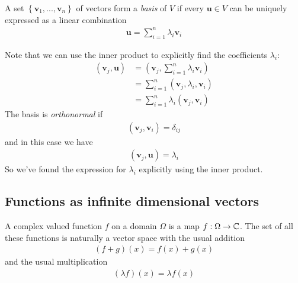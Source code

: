 \documentclass[a4paper]{article}
\begin{document}
A set $\left\{\mathbf{v}_1,...,\mathbf{v}_n\right\}$ of vectors form a \emph{basis} of $V$ if every $\mathbf{u}\in V$ can be uniquely expressed as a linear combination
\begin{equation*}
\begin{aligned}
\mathbf{u} = \sum_{i=1}^n \lambda_i \mathbf{v}_i
\end{aligned}
\end{equation*}

Note that we can use the inner product to explicitly find the coefficients $\lambda_i$:
\begin{equation*}
\begin{aligned}
\left(\mathbf{v}_j,\mathbf{u}\right) &= \left(\mathbf{v}_j,\sum_{i=1}^n \lambda_i \mathbf{v}_i\right)\\
&= \sum_{i=1}^n \left(\mathbf{v}_j,\lambda_i,\mathbf{v}_i\right)\\
&= \sum_{i=1}^n \lambda_i \left(\mathbf{v}_j,\mathbf{v}_i\right)
\end{aligned}
\end{equation*}
The basis is \emph{orthonormal} if
\begin{equation*}
\begin{aligned}
\left(\mathbf{v}_j,\mathbf{v}_i\right) = \delta_{ij}
\end{aligned}
\end{equation*}
and in this case we have
\begin{equation*}
\begin{aligned}
\left(\mathbf{v}_j,\mathbf{u}\right) = \lambda_i
\end{aligned}
\end{equation*}
So we've found the expression for $\lambda_i$ explicitly using the inner product.

\subsection{Functions as infinite dimensional vectors}

A complex valued function $f$ on a domain $\Omega$ is a map $f:\Omega \to \mathbb{C}$.
The set of all these functions is naturally a vector space with the usual addition
\begin{equation*}
\begin{aligned}
\left(f+g\right)\left(x\right) = f\left(x\right)+g\left(x\right)
\end{aligned}
\end{equation*}
and the usual multiplication
\begin{equation*}
\begin{aligned}
\left(\lambda f\right)\left(x\right) = \lambda f\left(x\right)
\end{aligned}
\end{equation*}
\end{document}
